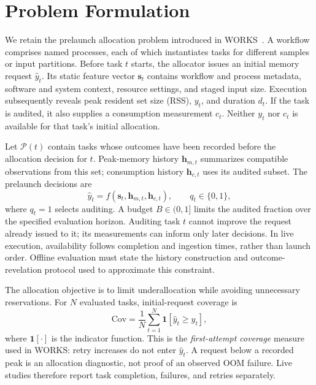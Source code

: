 \section{Problem Formulation}
\label{sec:problem}
We retain the prelaunch allocation problem introduced in
WORKS~\cite{camp2026works}. A workflow comprises named processes, each of
which instantiates tasks for different samples or input partitions.
Before task $t$ starts, the allocator issues an initial memory request
$\hat y_t$. Its static feature vector $\mathbf{s}_t$ contains workflow and
process metadata, software and system context, resource settings, and
staged input size. Execution subsequently reveals peak resident set size
(RSS), $y_t$, and duration $d_t$. If the task is audited, it also supplies a
consumption measurement $c_t$. Neither $y_t$ nor $c_t$ is available for that
task's initial allocation.

Let $\mathcal{P}(t)$ contain tasks whose outcomes have been recorded before
the allocation decision for $t$. Peak-memory history $\mathbf{h}_{m,t}$
summarizes compatible observations from this set; consumption history
$\mathbf{h}_{c,t}$ uses its audited subset. The prelaunch decisions are
\begin{equation}
\hat y_t=f(\mathbf{s}_t,\mathbf{h}_{m,t},\mathbf{h}_{c,t}),
\qquad q_t\in\{0,1\},
\label{eq:allocation_problem}
\end{equation}
where $q_t=1$ selects auditing. A budget $B\in(0,1]$ limits the audited
fraction over the specified evaluation horizon. Auditing task $t$ cannot
improve the request already issued to it; its measurements can inform
only later decisions. In live execution, availability follows completion
and ingestion times, rather than launch order. Offline evaluation must
state the history construction and outcome-revelation protocol used to
approximate this constraint.

The allocation objective is to limit underallocation while avoiding
unnecessary reservations. For $N$ evaluated tasks, initial-request
coverage is
\begin{equation}
\mathrm{Cov}=\frac{1}{N}\sum_{t=1}^{N}\mathbf{1}[\hat y_t\geq y_t],
\label{eq:coverage}
\end{equation}
where $\mathbf{1}[\cdot]$ is the indicator function. This is the
\emph{first-attempt coverage} measure used in WORKS: retry increases do not
enter $\hat y_t$. A request below a recorded peak is an allocation
diagnostic, not proof of an observed OOM failure. Live studies therefore
report task completion, failures, and retries separately.

